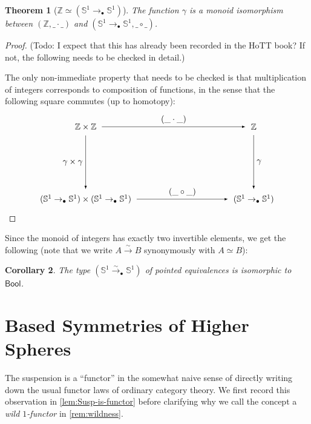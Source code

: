 \documentclass[11pt,a4paper,oneside,reqno]{amsart}
\newtheorem{theorem}{Theorem}
\newtheorem{corollary}[theorem]{Corollary}
\theoremstyle{definition}
\theoremstyle{remark}
\newcommand{\Z}{\mathbb Z}
\newcommand{\sph}[1]{{\mathbb S}^{#1}}
\newcommand{\pointedm}{\rightarrow_\bullet}
\begin{document}
\begin{theorem}[$\Z \simeq (\sph 1 \pointedm \sph 1)$]
 The function $\gamma$ is a monoid isomorphism between $(\Z, \_ \cdot \_)$ and $(\sph 1 \pointedm \sph 1, \_ \circ \_)$.
\end{theorem}
\begin{proof}
(Todo: I expect that this has already been recorded in the HoTT book?
If not, the following needs to be checked in detail.)

The only non-immediate property that needs to be checked is that multiplication of integers corresponds to composition of functions, in the sense that 
the following square commutes (up to homotopy):
\begin{equation}
\begin{tikzpicture}[x=7cm,y=-3cm,baseline=(current bounding box.center)]
 \tikzset{arrow/.style={shorten >=0.1cm,shorten <=.1cm,-latex}}
 \node (A) at (0,0) {$\Z \times \Z$}; 
 \node (B) at (0,1) {$(\sph 1 \pointedm \sph 1) \times (\sph 1 \pointedm \sph 1)$}; 
 \node (C) at (1,1) {$(\sph 1 \pointedm \sph 1)$}; 
 \node (D) at (1,0) {$\Z$}; 

 \draw[arrow] (A) to node [left] {$\gamma \times \gamma$} (B);
 \draw[arrow] (B) to node [above] {$(\_ \circ \_)$} (C);
 \draw[arrow] (D) to node [right] {$\gamma$} (C);
 \draw[arrow] (A) to node [above] {$(\_ \cdot \_)$} (D);
\end{tikzpicture}
\end{equation}
\end{proof}

Since the monoid of integers has exactly two invertible elements, we get the following
(note that we write $A \xrightarrow{\sim} B$ synonymously with $A \simeq B$):

\begin{corollary} \label{cor:sph1-bool}
 The type $(\sph 1 \xrightarrow{\sim}_\bullet \sph 1)$ of pointed equivalences
 is isomorphic to $\mathsf{Bool}$.
\end{corollary}

\section{Based Symmetries of Higher Spheres}

The suspension is a ``functor'' in the somewhat naive sense of directly writing down the usual functor laws of ordinary category theory.
We first record this observation in \cref{lem:Susp-is-functor}
before clarifying why we call the concept a \emph{wild $1$-functor} in \cref{rem:wildness}.
\end{document}
